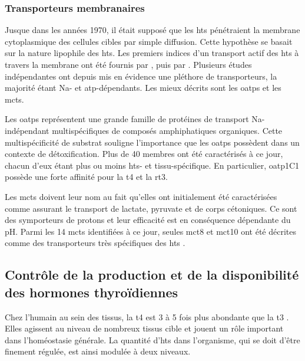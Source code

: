 \documentclass[../main.tex]{subfiles}
\begin{document}
\subsubsection{Transporteurs membranaires}
Jusque dans les années 1970, il était supposé que les \glspl{ht} pénétraient la membrane cytoplasmique des cellules cibles par simple diffusion. Cette hypothèse se basait sur la nature lipophile des \glspl{ht}.
Les premiers indices d'un transport actif des \glspl{ht} à travers la membrane ont été fournis par \citet{Christensen1954}, puis par \citet{Rao1976}. Plusieurs études indépendantes ont depuis mis en évidence une pléthore de transporteurs, la majorité étant \gls{Na}- et \gls{atp}-dépendants. Les mieux décrits sont les \glspl{oatp} et les \glspl{mct}.

Les \glspl{oatp} représentent une grande famille de protéines de transport \gls{Na}-indépendant multispécifiques de composés amphiphatiques organiques.
Cette multispécificité de substrat souligne l'importance que les \glspl{oatp} possèdent dans un contexte de détoxification.
Plus de 40 membres ont été caractérisés à ce jour, chacun d'eux étant plus ou moins \glspl{ht}- et tissu-spécifique.
En particulier, \gls{oatp}1C1 possède une forte affinité pour la \gls{t4} et la \gls{rt3}.

Les \glspl{mct} doivent leur nom au fait qu'elles ont initialement été caractérisées comme assurant le transport de lactate, pyruvate et de corps cétoniques.
Ce sont des symporteurs de protons et leur efficacité est en conséquence dépendante du pH.
Parmi les 14 \glspl{mct} identifiées à ce jour, seules \gls{mct}8 et \gls{mct}10 ont été décrites comme des transporteurs très spécifiques des \glspl{ht} \citep{Friesema2003,Friesema2008}.


\subsection{Contrôle de la production et de la disponibilité des hormones thyroïdiennes}\label{subsec:th-prod-control}
Chez l'humain au sein des tissus, la \gls{t4} est 3 à 5 fois plus abondante que la \gls{t3} \citep{Laurberg1984}. Elles agissent au niveau de nombreux tissus cible et jouent un rôle important dans l'homéostasie générale.
La quantité d'\glspl{ht} dans l'organisme, qui se doit d'être finement régulée, est ainsi modulée à deux niveaux.
\end{document}
